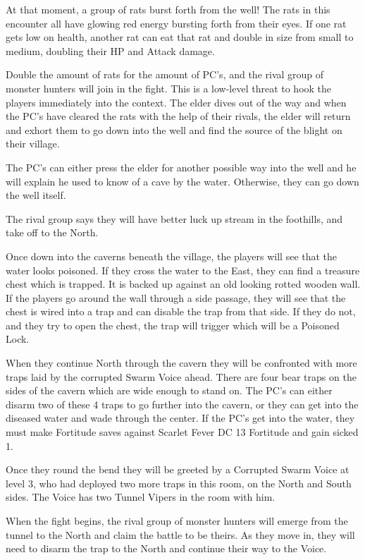 \begin{multicols}{2}
  At that moment, a group of rats burst forth from the well! The rats in this encounter all have glowing red energy bursting forth from their eyes. If one rat gets low on health, another rat can eat that rat and double in size from small to medium, doubling their HP and Attack damage.

  Double the amount of rats for the amount of PC's, and the rival group of monster hunters will join in the fight. This is a low-level threat to hook the players immediately into the context. The elder dives out of the way and when the PC's have cleared the rats with the help of their rivals, the elder will return and exhort them to go down into the well and find the source of the blight on their village.

  The PC's can either press the elder for another possible way into the well and he will explain he used to know of a cave by the water. Otherwise, they can go down the well itself.

  The rival group says they will have better luck up stream in the foothills, and take off to the North.

  Once down into the caverns beneath the village, the players will see that the water looks poisoned. If they cross the water to the East, they can find a treasure chest which is trapped. It is backed up against an old looking rotted wooden wall. If the players go around the wall through a side passage, they will see that the chest is wired into a trap and can disable the trap from that side. If they do not, and they try to open the chest, the trap will trigger which will be a Poisoned Lock.

  When they continue North through the cavern they will be confronted with more traps laid by the corrupted Swarm Voice ahead. There are four bear traps on the sides of the cavern which are wide enough to stand on. The PC's can either disarm two of these 4 traps to go further into the cavern, or they can get into the diseased water and wade through the center. If the PC's get into the water, they must make Fortitude saves against Scarlet Fever DC 13 Fortitude and gain sicked 1.

  Once they round the bend they will be greeted by a Corrupted Swarm Voice at level 3, who had deployed two more traps in this room, on the North and South sides. The Voice has two Tunnel Vipers in the room with him.

  When the fight begins, the rival group of monster hunters will emerge from the tunnel to the North and claim the battle to be theirs. As they move in, they will need to disarm the trap to the North and continue their way to the Voice.


\end{multicols}

